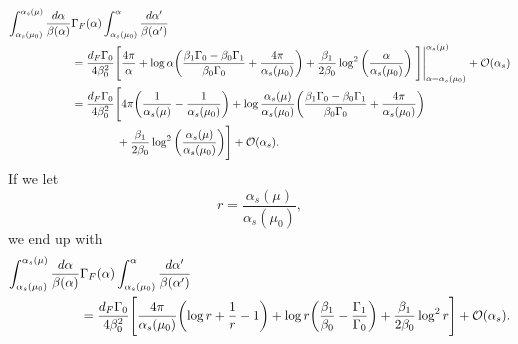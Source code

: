 \documentclass[11pt,twoside,reqno]{amsart}
\theoremstyle{plain}
\theoremstyle{remark}
\theoremstyle{definition}
\theoremstyle{remark}
\theoremstyle{definition}
\theoremstyle{definition}
\newcommand{\cO}{\mathcal{O}}
\begin{document}
	\begin{equation}
	\begin{aligned}
		\int_{\alpha_s(\mu_0)}^{\alpha_s(\mu)} \frac{d\alpha}{\beta(\alpha)}&\Gamma_F(\alpha)\int_{\alpha_s(\mu_0)}^\alpha \frac{d\alpha'}{\beta(\alpha')} \\
		&= \frac{d_F\Gamma_0}{4\beta_0^2}\Bigg[ \frac{4\pi}{\alpha} + \log\alpha \qty(\frac{\beta_1\Gamma_0 - \beta_0 \Gamma_1}{\beta_0\Gamma_0} + \frac{4\pi}{\alpha_s(\mu_0)}) + \frac{\beta_1}{2\beta_0}\log^2\qty(\frac{\alpha}{\alpha_s(\mu_0)}) \eval{\Bigg]}_{\alpha = \alpha_s(\mu_0)}^{\alpha_s(\mu)} + \cO(\alpha_s) \\
		&= \frac{d_F\Gamma_0}{4\beta_0^2}\Bigg[4\pi\qty(\frac{1}{\alpha_s(\mu)} - \frac{1}{\alpha_s(\mu_0)}) + \log\frac{\alpha_s(\mu)}{\alpha_s(\mu_0)}\qty(\frac{\beta_1\Gamma_0 - \beta_0 \Gamma_1}{\beta_0\Gamma_0} + \frac{4\pi}{\alpha_s(\mu_0)}) \\
			&\qquad\qquad+ \frac{\beta_1}{2\beta_0}\log^2\qty(\frac{\alpha_s(\mu)}{\alpha_s(\mu_0)})\Bigg] + \cO(\alpha_s).
	\end{aligned}
	\end{equation}
	If we let
	\begin{equation}
		r = \frac{\alpha_s(\mu)}{\alpha_s(\mu_0)},
	\end{equation}
	we end up with
	\begin{equation}\label{eq:first exponentiated integral}
	\begin{aligned}
		\int_{\alpha_s(\mu_0)}^{\alpha_s(\mu)} \frac{d\alpha}{\beta(\alpha)}&\Gamma_F(\alpha)\int_{\alpha_s(\mu_0)}^\alpha \frac{d\alpha'}{\beta(\alpha')} \\
		&= \frac{d_F\Gamma_0}{4\beta_0^2}\Bigg[\frac{4\pi}{\alpha_s(\mu_0)}\qty(\log r + \frac{1}{r} - 1) + \log r \qty(\frac{\beta_1}{\beta_0} - \frac{\Gamma_1}{\Gamma_0}) + \frac{\beta_1}{2\beta_0}\log^2 r \Bigg] + \cO(\alpha_s).
	\end{aligned}
	\end{equation}
\end{document}
